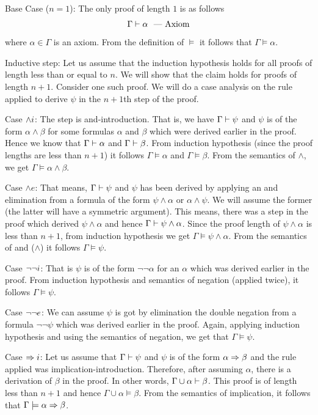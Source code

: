 
Base Case ($n=1$): The only proof of length $1$ is as follows
\[
\Gamma \vdash \alpha \text{~~--- Axiom}
\]
where $\alpha \in \Gamma$ is an axiom. From the definition of $\models$ it follows that $\Gamma \models \alpha$.

Inductive step: Let us assume that the induction hypothesis holds for all proofs of length less than or equal to $n$. We will show that the claim holds for proofs of length $n+1$. Consider one such proof. We will do a case analysis on the rule applied to derive $\psi$ in the $n+1$th step of the proof.

Case $\wedge i$: The step is and-introduction. That is, we have $\Gamma \vdash \psi$ and $\psi$ is of the form $\alpha \wedge \beta$ for some formulas $\alpha$ and $\beta$ which were derived earlier in the proof. Hence we know that $\Gamma \vdash \alpha$ and $\Gamma \vdash \beta$. From induction hypothesis (since the proof lengths are less than $n+1$) it follows $\Gamma \models \alpha$ and $\Gamma \models \beta$. From the semantics of $\wedge$, we get $\Gamma \models \alpha \wedge \beta$.

Case $\wedge e$: That means, $\Gamma \vdash \psi$ and $\psi$ has been derived by applying an and elimination from a formula of the form $\psi \wedge \alpha$ or $\alpha \wedge \psi$. We will assume the former (the latter will have a symmetric argument). This means, there was a step in the proof which derived $\psi \wedge \alpha$ and hence $\Gamma \vdash \psi \wedge \alpha$. Since the proof length of $\psi \wedge \alpha$ is less than $n+1$, from induction hypothesis we get $\Gamma \models \psi \wedge \alpha$. From the semantics of and ($\wedge$) it follows $\Gamma \models \psi$.

Case $\neg\neg i$: That is $\psi$ is of the form $\neg \neg \alpha$ for an $\alpha$ which was derived earlier in the proof. From induction hypothesis and semantics of negation (applied twice), it follows $\Gamma \models \psi$.

Case $\neg\neg e$: We can assume $\psi$ is got by elimination the double negation from a formula $\neg \neg \psi$ which was derived earlier in the proof. Again, applying induction hypothesis and using the semantics of negation, we get that $\Gamma \models \psi$.

Case $\Rightarrow i$: Let us assume that $\Gamma \vdash \psi$ and $\psi$ is of the form $\alpha \Rightarrow \beta$ and the rule applied was implication-introduction. Therefore, after assuming $\alpha$, there is a derivation of $\beta$ in the proof. In other words, $\Gamma \cup \alpha \vdash \beta$. This proof is of length less than $n+1$ and hence $\Gamma \cup \alpha \models \beta$. From the semantics of implication, it follows that $\Gamma \models \alpha \Rightarrow \beta$. 

